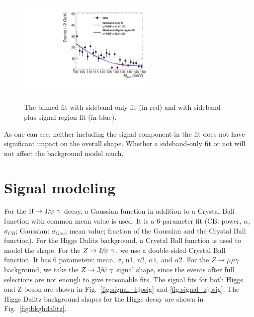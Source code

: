		\begin{figure}[!ht]
		    \centering
		    \includegraphics[width=0.6\textwidth]{Fig/Fit/fitExclude}\\
		    \caption[]{\label{fig:binfit_compare}
		     The binned fit with sideband-only fit (in red) and with sideband-plus-signal region  fit (in blue).}
		\end{figure}
		
		As one can see, neither including the signal component in the fit does not have significant impact on the overall shape. Whether a sideband-only fit or not will not affect the background model much.
		
		\clearpage
		
		\section{Signal modeling}
		\label{sec:SigModel}
		For the $\mathrm{H}\to{\mathrm{J}\hspace{-.08em}/\hspace{-.14em}\psi}\ \gamma$ decay, a Gaussian function in addition to a Crystal Ball function with common mean value is used. It is a 6-parameter fit (CB: power, $\alpha$, $\sigma_{CB}$; Gaussian: $\sigma_{Gau}$; mean value; fraction of the Gaussian and the Crystal Ball function).
		For the Higgs Dalitz background, a Crystal Ball function is used to model the shape.
		For the $Z\to\JPsi\ \gamma$, we use a double-sided Crystal Ball function. It has 6 parameters: mean, $\sigma$, n1, n2, $\alpha 1$, and $\alpha 2$.
		For the $Z\to\mu\mu\gamma$ background, we take the $Z\to\JPsi\ \gamma$ signal shape, since the events after full selections are not enough to give reasonable fits.
		The signal fits for both Higgs and Z boson are shown in Fig.~\ref{fig:signal_hjpsig} and \ref{fig:signal_zjpsig}. The Higgs Dalitz background shapes for the Higgs decay are shown in Fig.~\ref{fig:bkghdalitz}.
		
